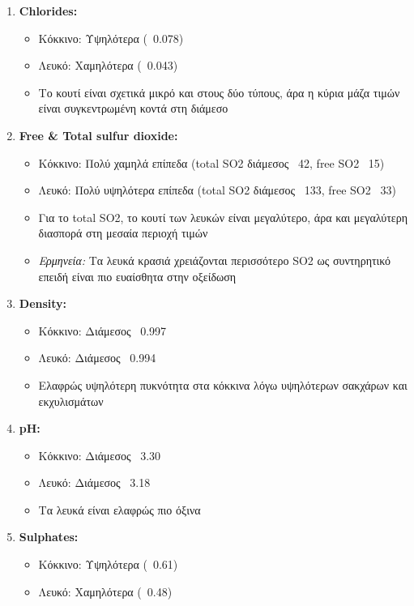 \documentclass[12pt,a4paper]{article}
\begin{document}
\begin{enumerate}
    \item \textbf{Chlorides:}
    \begin{itemize}
        \item Κόκκινο: Υψηλότερα (~0.078)
        \item Λευκό: Χαμηλότερα (~0.043)
        \item Το κουτί είναι σχετικά μικρό και στους δύο τύπους, άρα η κύρια μάζα τιμών είναι συγκεντρωμένη κοντά στη διάμεσο
    \end{itemize}
    
    \item \textbf{Free \& Total sulfur dioxide:}
    \begin{itemize}
        \item Κόκκινο: Πολύ χαμηλά επίπεδα (total SO2 διάμεσος ~42, free SO2 ~15)
        \item Λευκό: Πολύ υψηλότερα επίπεδα (total SO2 διάμεσος ~133, free SO2 ~33)
        \item Για το total SO2, το κουτί των λευκών είναι μεγαλύτερο, άρα και μεγαλύτερη διασπορά στη μεσαία περιοχή τιμών
        \item \textit{Ερμηνεία:} Τα λευκά κρασιά χρειάζονται περισσότερο SO2 ως συντηρητικό επειδή είναι πιο ευαίσθητα στην οξείδωση
    \end{itemize}
    
    \item \textbf{Density:}
    \begin{itemize}
        \item Κόκκινο: Διάμεσος ~0.997
        \item Λευκό: Διάμεσος ~0.994
        \item Ελαφρώς υψηλότερη πυκνότητα στα κόκκινα λόγω υψηλότερων σακχάρων και εκχυλισμάτων
    \end{itemize}
    
    \item \textbf{pH:}
    \begin{itemize}
        \item Κόκκινο: Διάμεσος ~3.30
        \item Λευκό: Διάμεσος ~3.18
        \item Τα λευκά είναι ελαφρώς πιο όξινα
    \end{itemize}
    
    \item \textbf{Sulphates:}
    \begin{itemize}
        \item Κόκκινο: Υψηλότερα (~0.61)
        \item Λευκό: Χαμηλότερα (~0.48)
    \end{itemize}
    

\end{enumerate}
\end{document}
